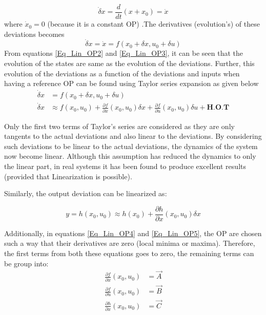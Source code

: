 \begin{equation} \label{Eq_Lin_OP2}
	\dot{\delta} x = \frac{d}{dt}({x} + {x_0}) = \dot{x}
\end{equation}
where $\dot{x}_{0} = 0$ (because it is a constant OP) .The derivatives (evolution's) of these deviations becomes
\begin{equation} \label{Eq_Lin_OP3}
	\dot{\delta} x = \dot{x} = f(x_0 + \delta x, u_0 + \delta u)
\end{equation}
From equations \eqref{Eq_Lin_OP2} and \eqref{Eq_Lin_OP3}, it can be seen that the evolution of the states are same as the evolution of the deviations. Further, this evolution of the deviations as a function of the deviations and inputs when having a reference OP can be found using Taylor series expansion as given below
\begin{align} \label{Eq_Lin_OP4}
	\dot{\delta} x &= f(x_0 + \delta x, u_0 + \delta u) \\
	\dot{\delta} x &\approx f(x_0,u_0) + \frac{\partial f}{\partial x}(x_0,u_0) \delta x + \frac{\partial f}{\partial u}(x_0,u_0) \delta u \label{Eq_delta_x_delta_u} + \textbf{H.O.T}
\end{align}

Only the first two terms of Taylor's series are considered as they are only tangents to the actual deviations and also linear to the deviations. By considering such deviations to be linear to the actual deviations, the dynamics of the system now become linear. Although this assumption has reduced the dynamics to only the linear part, in real systems it has been found to produce excellent results (provided that Linearization is possible).

Similarly, the output deviation can be linearized as:

\begin{equation} \label{Eq_Lin_OP5}
	y = h(x_0,u_0) \approx h(x_0) + \frac{\partial h}{\partial x}(x_0,u_0) \delta x
\end{equation}

Additionally, in equations \eqref{Eq_Lin_OP4} and \eqref{Eq_Lin_OP5}, the OP are chosen such a way that their derivatives are zero (local minima or maxima). Therefore, the first terms from both these equations goes to zero, the remaining terms can be group into:
\begin{align} \label{Eq_Jacobians}
	\frac{\partial f}{\partial x}(x_0,u_0) &= \vec{A} \\
	\frac{\partial f}{\partial u}(x_0,u_0) &= \vec{B} \\
	\frac{\partial h}{\partial x}(x_0,u_0) &= \vec{C}
\end{align}

